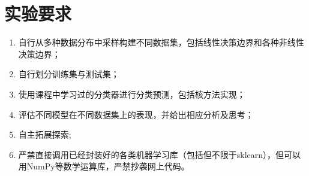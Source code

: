
\section{实验要求}

\begin{enumerate}[1.]
    \item 自行从多种数据分布中采样构建不同数据集，包括线性决策边界和各种非线性决策边界；
    \item 自行划分训练集与测试集；
    \item 使用课程中学习过的分类器进行分类预测，包括核方法实现；
    \item 评估不同模型在不同数据集上的表现，并给出相应分析及思考；
    \item 自主拓展探索;
    \item 严禁直接调用已经封装好的各类机器学习库（包括但不限于sklearn），但可以用NumPy等数学运算库，严禁抄袭网上代码。
\end{enumerate}

